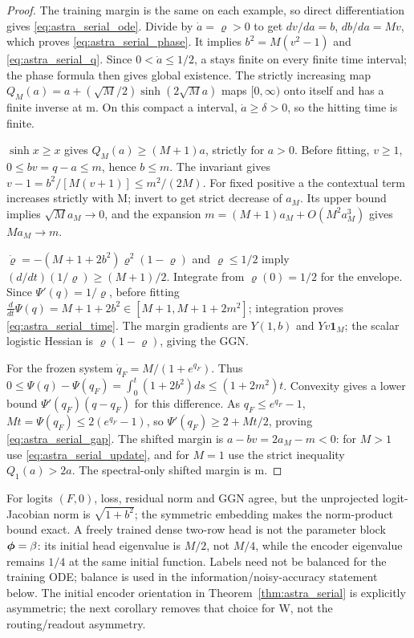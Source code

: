\begin{proof}
The training margin is the same on each example, so direct differentiation
gives \eqref{eq:astra_serial_ode}. Divide by $\dot a=\varrho>0$ to get
$dv/da=b$, $db/da=Mv$, which proves \eqref{eq:astra_serial_phase}.
It implies $b^2=M(v^2-1)$ and \eqref{eq:astra_serial_q}.
Since $0<\dot a\le1/2$, a stays finite on every finite time interval;
the phase formula then gives global existence. The strictly increasing
map $Q_M(a)=a+(\sqrt M/2)\sinh(2\sqrt M a)$ maps $[0,\infty)$
onto itself and has a finite inverse at m. On this compact a interval,
$\dot a\ge\delta>0$, so the hitting time is finite.

$\sinh x\ge x$ gives $Q_M(a)\ge(M+1)a$, strictly for $a>0$.
Before fitting, $v\ge1$, $0\le bv=q-a\le m$, hence $b\le m$.
The invariant gives $v-1=b^2/[M(v+1)]\le m^2/(2M)$.
For fixed positive a the contextual term increases strictly with M;
invert to get strict decrease of $a_M$. Its upper bound implies
$\sqrt M a_M\to0$, and the expansion
$m=(M+1)a_M+O(M^2a_M^3)$ gives $Ma_M\to m$.

$\dot\varrho=-(M+1+2b^2)\varrho^2(1-\varrho)$ and
$\varrho\le1/2$ imply $(d/dt)(1/\varrho)\ge(M+1)/2$.
Integrate from $\varrho(0)=1/2$ for the envelope.
Since $\Psi'(q)=1/\varrho$, before fitting
$\frac d{dt}\Psi(q)=M+1+2b^2\in[M+1,M+1+2m^2]$;
integration proves \eqref{eq:astra_serial_time}.
The margin gradients are $Y(1,b)$ and $Yv\boldsymbol1_M$;
the scalar logistic Hessian is $\varrho(1-\varrho)$, giving the GGN.

For the frozen system $\dot q_F=M/(1+e^{q_F})$. Thus
$0\le\Psi(q)-\Psi(q_F)=\int_0^t(1+2b^2)ds\le(1+2m^2)t$.
Convexity gives a lower bound $\Psi'(q_F)(q-q_F)$ for this difference.
As $q_F\le e^{q_F}-1$,
$Mt=\Psi(q_F)\le2(e^{q_F}-1)$, so
$\Psi'(q_F)\ge2+Mt/2$, proving \eqref{eq:astra_serial_gap}.
The shifted margin is $a-bv=2a_M-m<0$: for $M>1$ use
\eqref{eq:astra_serial_update}, and for $M=1$ use the strict
inequality $Q_1(a)>2a$. The spectral-only shifted margin is m.
\end{proof}

\begin{remark}
For logits $(F,0)$, loss, residual norm and GGN agree, but the unprojected
logit-Jacobian norm is $\sqrt{1+b^2}$; the symmetric embedding makes
the norm-product bound exact. A freely trained dense two-row head is
not the parameter block ${\boldsymbol{\phi}}=\beta$: its initial head eigenvalue is
$M/2$, not $M/4$, while the encoder eigenvalue remains $1/4$ at the
same initial function. Labels need not be balanced for the training
ODE; balance is used in the information/noisy-accuracy statement below.
The initial encoder orientation in Theorem~\ref{thm:astra_serial} is
explicitly asymmetric; the next corollary removes that choice for W,
not the routing/readout asymmetry.
\end{remark}

